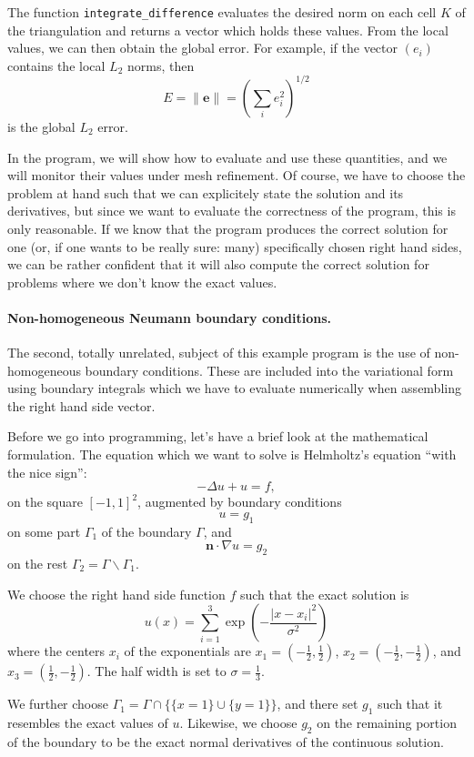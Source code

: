 \documentclass{article}
\begin{document}
The function \texttt{integrate\_difference} evaluates the desired norm on each
cell $K$ of the triangulation and returns a vector which holds these
values. From the local values, we can then obtain the global error. For
example, if the vector $(e_i)$ contains the local $L_2$ norms, then
$$
  E = \| {\mathbf e} \| = \left( \sum_i e_i^2 \right)^{1/2}
$$
is the global $L_2$ error.

In the program, we will show how to evaluate and use these quantities, and we
will monitor their values under mesh refinement. Of course, we have to choose
the problem at hand such that we can explicitely state the solution and its
derivatives, but since we want to evaluate the correctness of the program,
this is only reasonable. If we know that the program produces the correct
solution for one (or, if one wants to be really sure: many) specifically
chosen right hand sides, we can be rather confident that it will also compute
the correct solution for problems where we don't know the exact values.


\paragraph{Non-homogeneous Neumann boundary conditions.} The second, totally
unrelated, subject of this example program is the use of non-homogeneous
boundary conditions. These are included into the variational form using
boundary integrals which we have to evaluate numerically when assembling the
right hand side vector.

Before we go into programming, let's have a brief look at the mathematical
formulation. The equation which we want to solve is Helmholtz's equation
``with the nice sign'':
$$
  -\Delta u + u = f,
$$
on the square $[-1,1]^2$, augmented by boundary conditions
$$
  u = g_1
$$
on some part $\Gamma_1$ of the boundary $\Gamma$, and
$$
  {\mathbf n}\cdot \nabla u = g_2
$$
on the rest $\Gamma_2 = \Gamma \backslash \Gamma_1$.

We choose the right hand side function $f$ such that the exact solution is
$$
  u(x) = \sum_{i=1}^3 \exp\left(-\frac{|x-x_i|^2}{\sigma^2}\right)
$$
where the centers $x_i$ of the exponentials are 
  $x_1=(-\frac 12,\frac 12)$,
  $x_2=(-\frac 12,-\frac 12)$, and
  $x_3=(\frac 12,-\frac 12)$.
The half width is set to $\sigma=\frac 13$.

We further choose $\Gamma_1=\Gamma \cap\{\{x=1\} \cup \{y=1\}\}$, and there
set $g_1$ such that it resembles the exact values of $u$. Likewise, we choose
$g_2$ on the remaining portion of the boundary to be the exact normal
derivatives of the continuous solution.
\end{document}
